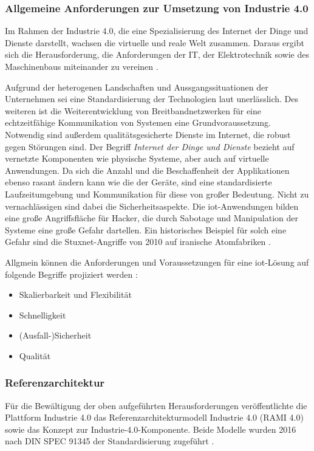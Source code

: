 \subsubsection{Allgemeine Anforderungen zur Umsetzung von Industrie 4.0}\label{general}

Im Rahmen der Industrie 4.0, die eine Spezialisierung des Internet der Dinge und Dienste darstellt, wachsen die virtuelle und reale Welt zusammen. Daraus ergibt sich die Herausforderung, die Anforderungen der IT, der Elektrotechnik sowie des Maschinenbaus miteinander zu vereinen \citep{Huebner2017}.

Aufgrund der heterogenen Landschaften und Aussgangssituationen der Unternehmen sei eine Standardisierung der Technologien laut \citet{Bauer2014} unerlässlich. Des weiteren ist die Weiterentwicklung von Breitbandnetzwerken für eine echtzeitfähige Kommunikation von Systemen eine Grundvoraussetzung. Notwendig sind außerdem qualitätsgesicherte Dienste im Internet, die robust gegen Störungen sind. Der Begriff \textit{Internet der Dinge und Dienste} bezieht auf vernetzte Komponenten wie physische Systeme, aber auch auf virtuelle Anwendungen. Da sich die Anzahl und die Beschaffenheit der Applikationen ebenso rasant ändern kann wie die der Geräte, sind eine standardisierte Laufzeitumgebung und Kommunikation für diese von großer Bedeutung. Nicht zu vernachlässigen sind dabei die Sicherheitsaspekte. Die \ac{iot}-Anwendungen bilden eine große Angriffsfläche für Hacker, die durch Sabotage und Manipulation der Systeme eine große Gefahr dartellen. Ein historisches Beispiel für solch eine Gefahr sind die Stuxnet-Angriffe von 2010 auf iranische Atomfabriken \citep{Bauer2014}.

Allgmein können die Anforderungen und Voraussetzungen für eine \ac{iot}-Lösung auf folgende Begriffe projiziert werden \citep{Acharya2019}:

\begin{itemize}
  \item Skalierbarkeit und Flexibilität
  \item Schnelligkeit
  \item (Ausfall-)Sicherheit
  \item Qualität
\end{itemize}

\subsubsection{Referenzarchitektur}\label{rami}

Für die Bewältigung der oben aufgeführten Herausforderungen veröffentlichte die Plattform Industrie 4.0 das \glqq Referenzarchitekturmodell Industrie 4.0\grqq{} (RAMI 4.0) sowie das Konzept zur \glqq Industrie-4.0-Komponente\grqq{}. Beide Modelle wurden 2016 nach DIN SPEC 91345 der Standardisierung zugeführt \citep{Beuth2016}.

